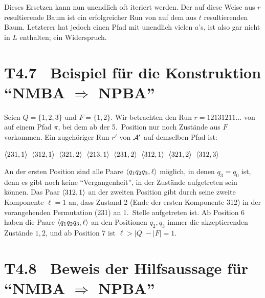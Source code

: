 \documentclass[fontsize=11pt, twoside=false, numbers=autoenddot]{scrbook}
\begin{document}
Dieses Ersetzen kann nun unendlich oft iteriert werden.
Der auf diese Weise aus $r$ resultierende Baum ist ein erfolgreicher Run von \Amc
auf dem aus $t$ resultierenden Baum.
Letzterer hat jedoch einen Pfad mit unendlich vielen $a$'s,
ist also gar nicht in $L$ enthalten; ein Widerspruch.
\qedhere

\section*{{\boldmath T4.7~ Beispiel für die Konstruktion "`NMBA $\Rightarrow$ NPBA"'}}

Seien $Q=\{1,2,3\}$ und $F=\{1,2\}$.
Wir betrachten den Run $r=12131211\dots$ von \Amc auf einem Pfad $\pi$,
bei dem ab der 5.\ Position nur noch Zustände aus $F$ vorkommen.
Ein zugehöriger Run $r'$ von $\mathcal{A}'$ auf demselben Pfad ist:
%
\begin{center}
  $\langle 231,1\rangle$\,
  $\langle 312,1\rangle$\,
  $\langle 321,2\rangle$\,
  $\langle 213,1\rangle$\,
  $\langle 231,2\rangle$\,
  $\langle 312,1\rangle$\,
  $\langle 321,2\rangle$\,
  $\langle 312,3\rangle$
\end{center}
An der ersten Position sind alle Paare $\langle q_1q_2q_3,\ell\rangle$ möglich,
in denen $q_3 = q_0$ ist, denn es gibt noch keine "`Vergangenheit"',
in der Zustände aufgetreten sein können.
Das Paar $\langle 312,1\rangle$ an der zweiten Position gibt durch seine zweite
Komponente $\ell=1$ an, dass Zustand 2 (Ende der ersten Komponente 312)
in der vorangehenden Permutation (231) an 1.\ Stelle aufgetreten ist.
Ab Position 6 haben die Paare $\langle q_1q_2q_3,\ell\rangle$
an den Positionen $q_2,q_3$ immer die akzeptierenden Zustände $1,2$,
und ab Position 7 ist $\ell > |Q|-|F| = 1$.

\goodbreak
\section*{{\boldmath T4.8~ Beweis der Hilfsaussage für "`NMBA $\Rightarrow$ NPBA"'}}
\end{document}
